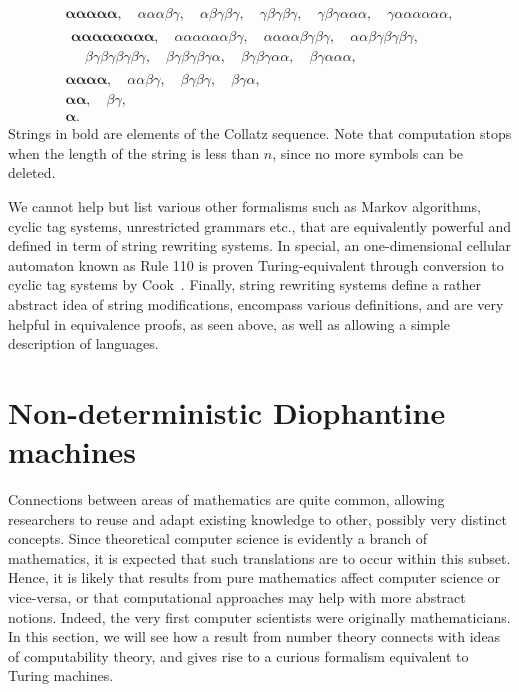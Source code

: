 \documentclass[12pt]{article}
\begin{document}
\begin{align}
    \boldsymbol{\alpha\alpha\alpha\alpha\alpha}, 
        \quad \alpha\alpha\alpha\beta\gamma,
        \quad \alpha\beta\gamma\beta\gamma,
        \quad \gamma\beta\gamma\beta\gamma,
        \quad \gamma\beta\gamma\alpha\alpha\alpha,
        \quad \gamma\alpha\alpha\alpha\alpha\alpha\alpha, \\
    \begin{split}
        \boldsymbol{\alpha\alpha\alpha\alpha\alpha\alpha\alpha\alpha}, 
            \quad \alpha\alpha\alpha\alpha\alpha\alpha\beta\gamma, 
            \quad \alpha\alpha\alpha\alpha\beta\gamma\beta\gamma, 
            \quad \alpha\alpha\beta\gamma\beta\gamma\beta\gamma, \\ 
            \quad \beta\gamma\beta\gamma\beta\gamma\beta\gamma, 
            \quad \beta\gamma\beta\gamma\beta\gamma\alpha, 
            \quad \beta\gamma\beta\gamma\alpha\alpha, 
            \quad \beta\gamma\alpha\alpha\alpha, &
    \end{split} \\
    \boldsymbol{\alpha\alpha\alpha\alpha}, 
        \quad \alpha\alpha\beta\gamma,
        \quad \beta\gamma\beta\gamma,
        \quad \beta\gamma\alpha, \\
    \boldsymbol{\alpha\alpha},
        \quad \beta\gamma, \\
    \boldsymbol{\alpha}.
\end{align}
Strings in bold are elements of the Collatz sequence. Note that computation stops when the length of the string is less than $n$, since no more symbols can be deleted.

We cannot help but list various other formalisms such as Markov algorithms, cyclic tag systems, unrestricted grammars etc., that are equivalently powerful and defined in term of string rewriting systems. In special, an one-dimensional cellular automaton known as Rule 110 is proven Turing-equivalent through conversion to cyclic tag systems by Cook~\cite{Cook:article:2004:mar}. Finally, string rewriting systems define a rather abstract idea of string modifications, encompass various definitions, and are very helpful in equivalence proofs, as seen above, as well as allowing a simple description of languages.

\section{Non-deterministic Diophantine machines}\label{sec:nddm}

Connections between areas of mathematics are quite common, allowing researchers to reuse and adapt existing knowledge to other, possibly very distinct concepts. Since theoretical computer science is evidently a branch of mathematics, it is expected that such translations are to occur within this subset. Hence, it is likely that results from pure mathematics affect computer science or vice-versa, or that computational approaches may help with more abstract notions. Indeed, the very first computer scientists were originally mathematicians. In this section, we will see how a result from number theory connects with ideas of computability theory, and gives rise to a curious formalism equivalent to Turing machines.
\end{document}

